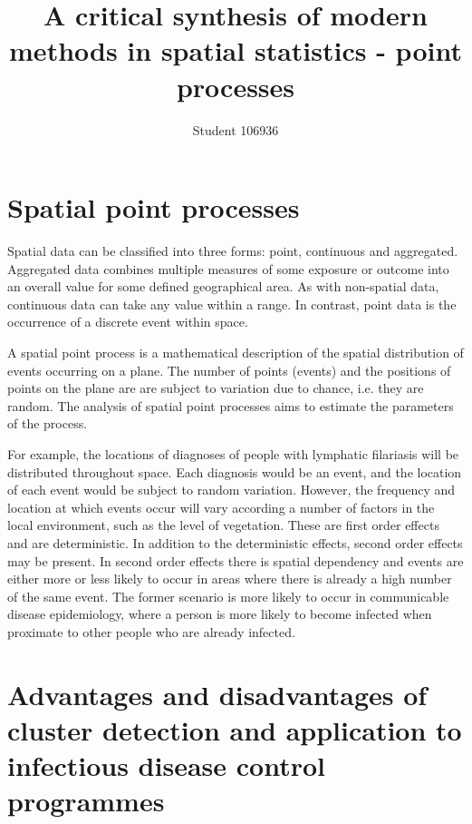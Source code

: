 \documentclass[a4paper,11pt]{article}
\title{A critical synthesis of modern methods in spatial statistics - point processes}
\author{Student 106936}
\begin{document}
\maketitle
\section{Spatial point processes}
Spatial data can be classified into three forms: point, continuous and aggregated. 
Aggregated data combines multiple measures of some exposure or outcome into an overall value for some defined geographical area. 
As with non-spatial data, continuous data can take any value within a range. 
In contrast, point data is the occurrence of a discrete event within space. 

A spatial point process is a mathematical description of the spatial distribution of events occurring on a plane. 
The number of points (events) and the positions of points on the plane are are subject to variation due to chance, i.e. they are random. 
The analysis of spatial point processes aims to estimate the parameters of the process. 

For example, the locations of diagnoses of people with lymphatic filariasis will be distributed throughout space. 
Each diagnosis would be an event, and the location of each event would be subject to random variation. 
However, the frequency and location at which events occur will vary according a number of factors in the local environment, such as the level of vegetation. \cite{Stensgaard2011}
These are first order effects and are deterministic. 
In addition to the deterministic effects, second order effects may be present. 
In second order effects there is spatial dependency and events are either more or less likely to occur in areas where there is already a high number of the same event. 
The former scenario is more likely to occur in communicable disease epidemiology, where a person is more likely to become infected when proximate to other people who are already infected. 


\section{Advantages and disadvantages of cluster detection and application to infectious disease control programmes}
\end{document}
